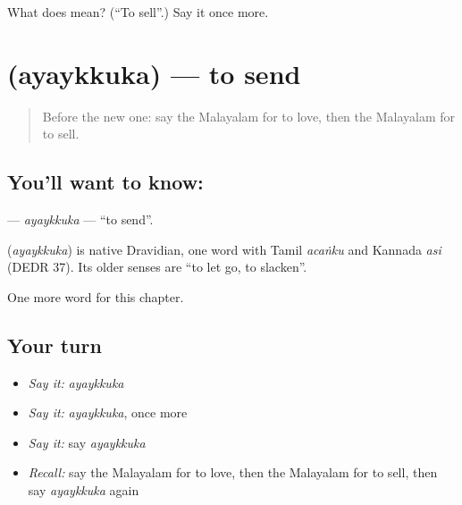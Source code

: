 \begin{tcolorbox}[breakable,colback=teal!4,colframe=teal!35!black,title={Before you move on}]
What does  mean? (\textquotedblleft{}To sell\textquotedblright{}.) Say it once more.
\end{tcolorbox}
\section[\texorpdfstring{\ml{അയയ്ക്കുക} (ayaykkuka)}{അയയ്ക്കുക (ayaykkuka)}]{ (ayaykkuka) — to send}

\label{lesson:ML-C175-ayaykkuka}



\begin{quote}
Before the new one: say the Malayalam for to love, then the Malayalam for to sell.
\end{quote}

\subsection*{You'll want to know: }
\textbf{} — \emph{ayaykkuka} — \textquotedblleft{}to send\textquotedblright{}.

\begin{cousinweb}
\textbf{} (\emph{ayaykkuka}) is native Dravidian, one word with Tamil \emph{acaṅku} and Kannada \emph{asi} (DEDR 37). Its older senses are \textquotedblleft{}to let go, to slacken\textquotedblright{}.
\end{cousinweb}

\begin{grammarlens}[title={What you've built}]
One more word for this chapter.
\end{grammarlens}

\subsection*{Your turn}
\begin{itemize}
\raggedright
  \item \emph{Say it:} \emph{ayaykkuka}
  \item \emph{Say it:} \emph{ayaykkuka}, once more
  \item \emph{Say it:} say \emph{ayaykkuka}
  \item \emph{Recall:} say the Malayalam for to love, then the Malayalam for to sell, then say \emph{ayaykkuka} again
\end{itemize}

